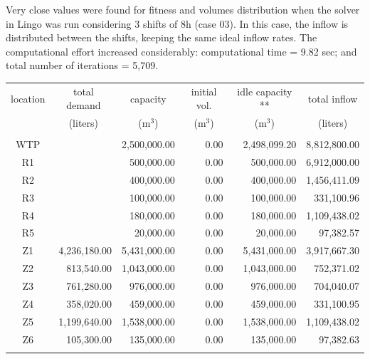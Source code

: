 \documentclass{singlecol}
\theoremstyle{TH}{
\newtheorem{lemma}{Lemma}
\newtheorem{theorem}[lemma]{Theorem}
\newtheorem{corrolary}[lemma]{Corrolary}
\newtheorem{conjecture}[lemma]{Conjecture}
\newtheorem{proposition}[lemma]{Proposition}
\newtheorem{claim}[lemma]{Claim}
\newtheorem{stheorem}[lemma]{Wrong Theorem}
\newtheorem{algorithm}{Algorithm}
}
\theoremstyle{THrm}{
\newtheorem{definition}{Definition}[section]
\newtheorem{question}{Question}[section]
\newtheorem{remark}{Remark}
\newtheorem{scheme}{Scheme}
}
\theoremstyle{THhit}{
\newtheorem{case}{Case}[section]
}
\begin{document}
Very close values were found for fitness and volumes distribution when the solver in Lingo was run considering 3 shifts of 8h (case 03). In this case, the inflow is distributed between the shifts, keeping the same ideal inflow rates. The computational effort increased considerably: computational time = 9.82 sec; and total number of iterations = 5,709.

\begin{table}[t]
\begin{center}
\begin{small}
	\begin{tabular}{ c r r r r r } 
		location & \multicolumn{1}{c}{total demand}      & \multicolumn{1}{c}{capacity} & \multicolumn{1}{c}{initial vol.} & \multicolumn{1}{c}{idle capacity **} & \multicolumn{1}{c}{total inflow}  \\
		      & \multicolumn{1}{c}{(liters)} & \multicolumn{1}{c}{(m$^3$)}   & \multicolumn{1}{c}{(m$^3$)}     &  \multicolumn{1}{c}{(m$^3$)}   &  \multicolumn{1}{c}{(liters)}               \\
		\\
		WTP   &              & 2,500,000.00 & 0.00 &  2,498,099.20 & 8,812,800.00 \\
		R1    &              &   500,000.00 & 0.00 &    500,000.00 & 6,912,000.00 \\
		R2    &              &   400,000.00 & 0.00 &    400,000.00 & 1,456,411.09 \\
		R3    &              &   100,000.00 & 0.00 &    100,000.00 &   331,100.96 \\
	    R4    &              &   180,000.00 & 0.00 &    180,000.00 & 1,109,438.02 \\
	    R5    &              &    20,000.00 & 0.00 &     20,000.00 &    97,382.57 \\
	    Z1    & 4,236,180.00 & 5,431,000.00 & 0.00 &  5,431,000.00 & 3,917,667.30 \\
	    Z2    &   813,540.00 & 1,043,000.00 & 0.00 &  1,043,000.00 &   752,371.02 \\
	    Z3    &   761,280.00 &   976,000.00 & 0.00 &    976,000.00 &   704,040.07 \\
	    Z4    &   358,020.00 &   459,000.00 & 0.00 &    459,000.00 &   331,100.95 \\
	    Z5    & 1,199,640.00 & 1,538,000.00 & 0.00 &  1,538,000.00 & 1,109,438.02 \\
	    Z6    &   105,300.00 &   135,000.00 & 0.00 &    135,000.00 &    97,382.63 \\
	    \\

\end{tabular}
\end{small}
\end{center}
\end{table}
\end{document}
